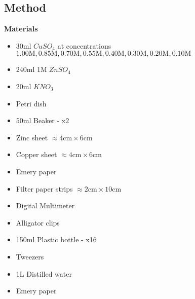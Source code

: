 \documentclass[11pt,a4paper]{article}
\begin{document}
\subsection{Method}
\textbf{Materials}
\begin{itemize}
	\item 30ml $CuSO_4$ at concentrations $1.00\textrm{M}, 0.85\textrm{M}, 0.70\textrm{M}, 0.55\textrm{M}, 0.40\textrm{M}, 0.30\textrm{M}, 0.20\textrm{M}, 0.10\textrm{M}$
	\item 240ml $1$M$\;ZnSO_4$
	\item 20ml $KNO_3$
	\item Petri dish
	\item $50\textrm{ml}$ Beaker - x$2$
	\item Zinc sheet $\approx4\textrm{cm}\times6\textrm{cm}$ 
	\item Copper sheet $\approx4\textrm{cm}\times6\textrm{cm}$ 
	\item Emery paper
	\item Filter paper strips $\approx 2\textrm{cm}\times10\textrm{cm}$
	\item Digital Multimeter
	\item Alligator clips
	\item 150ml Plastic bottle - x16
	\item Tweezers 
	\item 1L Distilled water
	\item Emery paper
\end{itemize}
\end{document}

